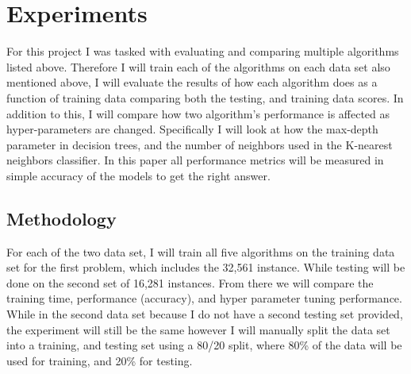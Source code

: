 \documentclass[
	letterpaper, %
]{IEEEtran}
\begin{document}
	\section{Experiments}
	For this project I was tasked with evaluating and comparing multiple algorithms listed above. Therefore I will train each of the algorithms on each data set also mentioned above, I will evaluate the results of how each algorithm does as a function of training data comparing both the testing, and training data scores. In addition to this, I will compare how two algorithm's performance is affected as hyper-parameters are changed. Specifically I will look at how the max-depth parameter in decision trees, and the number of neighbors used in the K-nearest neighbors classifier. In this paper all performance metrics will be measured in simple accuracy of the models to get the right answer.
	
	\subsection{Methodology}
	For each of the two data set, I will train all five algorithms on the training data set for the first problem, which includes the 32,561 instance. While testing will be done on the second set of 16,281 instances. From there we will compare the training time, performance (accuracy), and hyper parameter tuning performance. While in the second data set because I do not have a second testing set provided, the experiment will still be the same however I will manually split the data set into a training, and testing set using a 80/20 split, where 80\% of the data will be used for training, and 20\% for testing.
	
\end{document}
